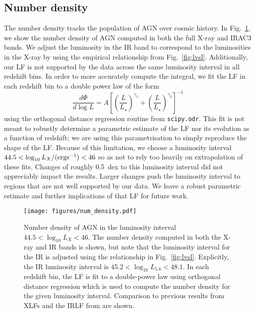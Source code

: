 \documentclass[twocolumn, trackchanges]{aastex63}
\begin{document}
\subsection{Number density}
The number density tracks the population of AGN over cosmic history.
In Fig.~\ref{fig:num_dens}, we show the number density of AGN computed in both the full X-ray and IRAC3 bands.
We adjust the luminosity in the IR band to correspond to the luminosities in the X-ray by using the empirical relationship from Fig.~\ref{fig:lvsl}.
Additionally, our LF is not supported by the data across the same luminosity interval in all redshift bins.
In order to more accurately compute the integral, we fit the LF in each redshift bin to a double power law of the form
\begin{equation}
\label{eq:dpl}
\frac{d\Phi}{d\log L} = A \left[\left(\frac{L}{L_\star}\right)^{\gamma_1} + \left(\frac{L}{L_\star}\right)^{\gamma_2} \right]^{-1}
\end{equation}
using the orthogonal distance regression routine from \texttt{scipy.odr}.
This fit is not meant to robustly determine a parametric estimate of the LF nor its evolution as a function of redshift; we are using this parametrisation to simply reproduce the shape of the LF.
Because of this limitation, we choose a luminosity interval $44.5 < \log_{10} L_X / ({\rm erg s^{-1}}) < 46$ so as not to rely too heavily on extrapolation of these fits.
Changes of roughly \SI{0.5}{dex} to this luminosity interval did not appreciably impact the results.
Larger changes push the luminosity interval to regions that are not well supported by our data.
We leave a robust parametric estimate and further implications of that LF for future work.

\begin{figure}[hptb]
\centering
\texttt{[image: figures/num\_density.pdf]}
\caption{Number density of AGN in the luminosity interval $44.5 < \log_{10} L_X < 46$. The number density computed in both the X-ray and IR bands is shown, but note that the luminosity interval for the IR is adjusted using the relationship in Fig.~\ref{fig:lvsl}. Explicitly, the IR luminosity interval is $45.2 < \log_{10} L_{5.8} < 48.1$. In each redshift bin, the LF is fit to a double-power law using orthogonal distance regression which is used to compute the number density for the given luminosity interval. Comparison to previous results from XLFs \citep{yencho_optx_2009, ranalli_210_2016, aird_evolution_2010} and the IRLF from \cite{lacy_spitzer_2015} are shown.}
\label{fig:num_dens}
\end{figure}
\end{document}
